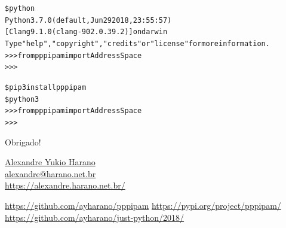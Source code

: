 \documentclass[11pt]{beamer}
\begin{document}
\begin{frame}[fragile]
\begin{alltt}\scriptsize
\$ python
Python 3.7.0 (default, Jun 29 2018, 23:55:57)
[Clang 9.1.0 (clang-902.0.39.2)] on darwin
Type "help", "copyright", "credits" or "license" for more information.
>>> from pppipam import AddressSpace
>>>
\end{alltt}
\end{frame}

\begin{frame}[standout]
\begin{alltt}
\$ pip3 install pppipam\newline
\newline
\$ python3\newline
>>> from pppipam import AddressSpace\\
>>>
\end{alltt}
\end{frame}


\begin{frame}[standout]
  \vspace*{2cm}
  \huge{Obrigado!}
  \begin{block}{}
    \vspace*{-.5cm}
    \begin{flushright}
      \large{\href{https://alexandre.harano.net.br/}{Alexandre Yukio Harano}} \\ \vspace*{0.1cm}
      \small{\href{mailto:alexandre@harano.net.br}{alexandre@harano.net.br}} \\
      \small{\url{https://alexandre.harano.net.br/}}
    \end{flushright}
    \vspace*{.2cm}
    \begin{flushleft}
      \normalsize{\url{https://github.com/ayharano/pppipam}}
      \normalsize{\url{https://pypi.org/project/pppipam/}}
      \normalsize{\url{https://github.com/ayharano/just-python/2018/}}
    \end{flushleft}
  \end{block}
\end{frame}
\end{document}
